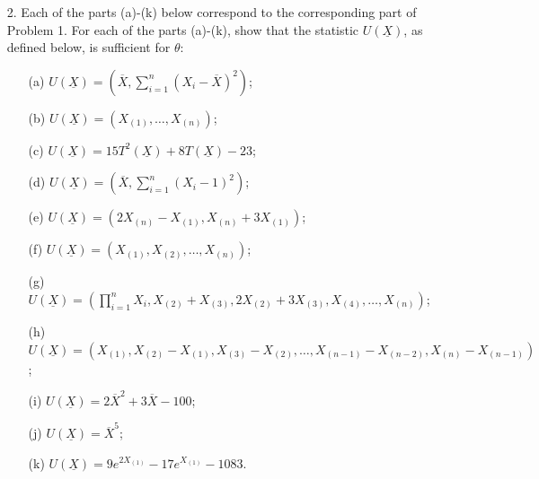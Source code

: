 \documentclass[11pt]{article}
\begin{document}
\vspace{1em}

\begin{enumerate}
    \item[2.] Each of the parts (a)-(k) below correspond to the corresponding part of Problem 1. For each of the parts (a)-(k), show that the statistic $U(\underline{X})$, as defined below, is sufficient for $\theta$:
    \begin{itemize}
        \item[(a)] $U(\underline{X}) = (\overline{X}, \sum_{i=1}^{n}(X_i - \overline{X})^2)$;
        \item[(b)] $U(\underline{X}) = (X_{(1)}, \dots, X_{(n)})$;
        \item[(c)] $U(\underline{X}) = 15T^2(\underline{X}) + 8T(\underline{X}) - 23$;
        \item[(d)] $U(\underline{X}) = (\overline{X}, \sum_{i=1}^{n}(X_i - 1)^2)$;
        \item[(e)] $U(\underline{X}) = (2X_{(n)} - X_{(1)}, X_{(n)} + 3X_{(1)})$;
        \item[(f)] $U(\underline{X}) = (X_{(1)}, X_{(2)}, \dots, X_{(n)})$;
        \item[(g)] $U(\underline{X}) = (\prod_{i=1}^{n} X_i, X_{(2)} + X_{(3)}, 2X_{(2)} + 3X_{(3)}, X_{(4)}, \dots, X_{(n)})$;
        \item[(h)] $U(\underline{X}) = (X_{(1)}, X_{(2)} - X_{(1)}, X_{(3)} - X_{(2)}, \dots, X_{(n-1)} - X_{(n-2)}, X_{(n)} - X_{(n-1)})$;
        \item[(i)] $U(\underline{X}) = 2\overline{X}^2 + 3\overline{X} - 100$;
        \item[(j)] $U(\underline{X}) = \overline{X}^5$;
        \item[(k)] $U(\underline{X}) = 9e^{2X_{(1)}} - 17e^{X_{(1)}} - 1083$.
    \end{itemize}
\end{enumerate}

\vspace{1em}
\end{document}
